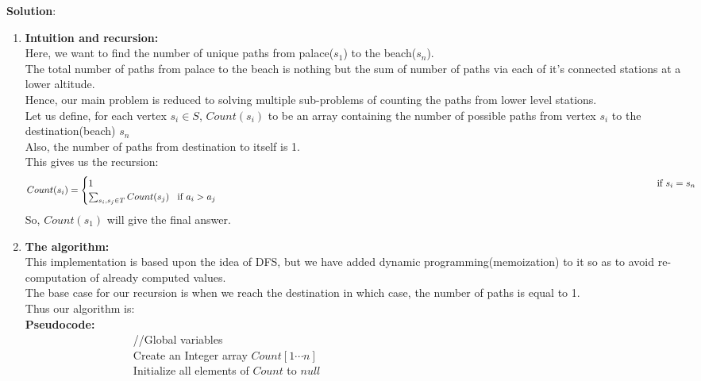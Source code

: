 \documentclass[12pt]{article}
\begin{document}
\begin{enumerate}
\begin{enumerate}
\textbf{Solution}:
\begin{enumerate}
\item  \textbf{Intuition and recursion:}\\
Here, we want to find the number of unique paths from palace($s_1$) to the beach($s_n$).\\
The total number of paths from palace to the beach is nothing but the sum of number of paths via each of it's connected stations at a lower altitude.\\
Hence, our main problem is reduced to solving multiple sub-problems of counting the paths from lower level stations. \\
Let us define, for each vertex ${s_i \in S}$, $Count(s_i)$ to be an array containing the number of possible paths from vertex $s_i$ to the destination(beach) $s_n$\\
Also, the number of paths from destination to itself is 1. \\
This gives us the recursion:
\begin{equation*}
	Count(s_i) = 
	\begin{cases}
		1  \verb|		| \verb|		| \verb|		| \verb|		| \verb|		| \verb|		| \verb|		| \verb|		| \verb|		| \verb|		| \verb|		| \verb|		| \verb|		| \verb|		| \verb|  |\text{  if  $s_i = s_n$} \\
		\sum_{s_i,s_j \in T}  Count(s_j)  \verb| | \text {   if $a_i > a_j $}\\
	\end{cases}
\end{equation*}	
So, $Count(s_1)$ will give the final answer.\\

\item  \textbf{The algorithm:}\\
This implementation is based upon the idea of DFS, but we have added dynamic programming(memoization) to it so as to avoid re-computation of already computed values.\\
The base case for our recursion is when we reach the destination in which case, the number of paths is equal to 1.\\
Thus our algorithm is:\\
\textbf{Pseudocode:}\\
\verb|			|\verb|			|//Global variables\\
\verb|			|\verb|			|Create an Integer array $Count[1 \cdots n]$ \\
\verb|			|\verb|			|Initialize all elements of $Count$ to $null$\\


\end{enumerate}
\end{enumerate}
\end{enumerate}
\end{document}
